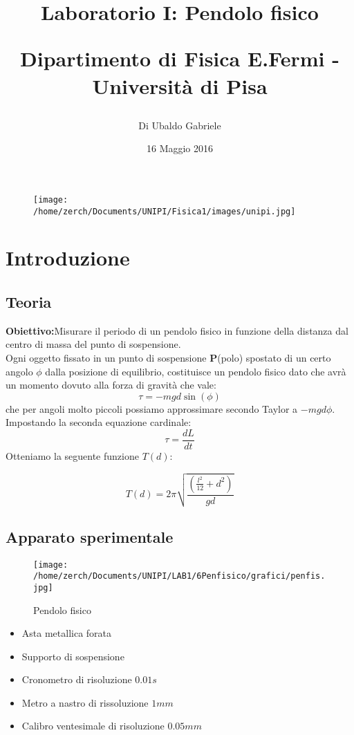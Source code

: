 \documentclass[a4paper,10pt]{article}
\title{Laboratorio I: Pendolo fisico\\
\begin{large}
Dipartimento di Fisica E.Fermi - Università di Pisa
\end{large}}
\author{Di Ubaldo Gabriele}
\date{16 Maggio 2016}
\begin{document}
\pagestyle{fancy}
\maketitle
\begin{figure}[!htb]
 \centering
 \texttt{[image: /home/zerch/Documents/UNIPI/Fisica1/images/unipi.jpg]}
\end{figure}
\tableofcontents
\section{Introduzione}
\subsection{Teoria}
\textbf{Obiettivo:}Misurare il periodo di un pendolo fisico in funzione della distanza dal centro di massa del punto di sospensione.\\
Ogni oggetto fissato in un punto di sospensione \textbf{P}(polo) spostato di un certo angolo $\phi$ dalla posizione di equilibrio, 
costituisce un pendolo fisico dato che avrà un momento dovuto alla forza di gravità che vale:
\begin{equation}
 \tau=-m g d \sin(\phi)
\end{equation}
che per angoli molto piccoli possiamo approssimare secondo Taylor a $-mgd\phi$.
Impostando la seconda equazione cardinale:
\begin{equation}
\tau=\frac{dL}{dt}
\end{equation}
Otteniamo la seguente funzione $T(d)$:

\begin{equation}
 T(d)=2\pi \sqrt{\frac{(\frac{l^2}{12}+d^2)}{g d}}
\end{equation}

\subsection{Apparato sperimentale}
\begin{figure}[!htb]
 \centering
 \caption{Pendolo fisico}
 \texttt{[image: /home/zerch/Documents/UNIPI/LAB1/6Penfisico/grafici/penfis.jpg]}
\end{figure}

\begin{itemize}
 \item Asta metallica forata
 \item Supporto di sospensione 
 \item Cronometro di risoluzione $0.01s$
 \item Metro a nastro di rissoluzione $1mm$
 \item Calibro ventesimale di risoluzione $0.05mm$
\end{itemize}
\end{document}
